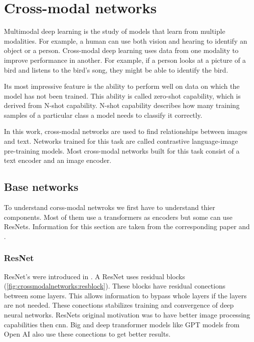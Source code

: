 %
%
%


\chapter{Cross-modal networks
    \label{chapter:crossmodalnetworks}}
    Multimodal deep learning is the study of models that learn from multiple modalities.
    For example, a human can use both vision and hearing to identify an object or a person.
    Cross-modal deep learning uses data from one modality to improve performance in another.
    For example, if a person looks at a picture of a bird and listens to the bird's song, they might be able to identify the bird.
    
    Its most impressive feature is the ability to perform well on data on which the model has not been trained.
    This ability is called zero-shot capability, which is derived from N-shot capability.
    N-shot capability describes how many training samples of a particular class a model needs to classify it correctly.

    In this work, cross-modal networks are used to find relationships between images and text.
    Networks trained for this task are called contrastive language-image pre-training models.
    Most cross-modal networks built for this task consist of a text encoder and an image encoder.

    \section{Base networks}
    To understand corss-modal netwroks we first have to understand thier components.
    Most of them use a transformers as encoders but some can use ResNets.
    Information for this section are taken from the corresponding paper and \cite{clipexplain}.
    
    \subsection{ResNet
    \label{crossmodalnetworks:sec:resnet}}
    ResNet's were introduced in \cite{resnetpaper}.
    A ResNet uses residual blocks (\cref{fig:crossmodalnetworks:resblock}).
    These blocks have residual conections between some layers.
    This allows information to bypass whole layers if the layers are not needed.
    These conections stabilizes training and convergence of deep neural networks.
    ResNets original motivation was to have better image processing capabilities then \acrfull{cnn}.
    Big and deep transformer models like GPT models from Open AI also use these conections to get better results.

